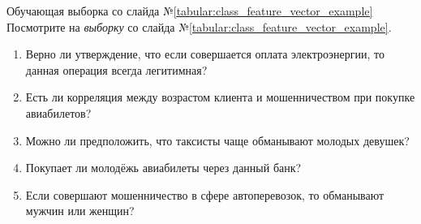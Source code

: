 \documentclass{beamer}
\newcommand{\term}{\textit}
\begin{document}
   \begin{frame}{Обучающая выборка со слайда №\ref{tabular:class_feature_vector_example}}
 	Посмотрите на \term{выборку} со слайда №\ref{tabular:class_feature_vector_example}. 
 	\begin{enumerate}
 	\item Верно ли утверждение, что если совершается оплата электроэнергии, то данная операция всегда легитимная?
 	\item Есть ли корреляция между возрастом клиента и мошенничеством при покупке авиабилетов? 
 	\item Можно ли предположить, что таксисты чаще обманывают молодых девушек? 
 	\item Покупает ли молодёжь авиабилеты через данный банк? 
 	\item Если совершают мошенничество в сфере автоперевозок, то обманывают мужчин или женщин?
	\end{enumerate}
	\end{frame}
  
\end{document}
